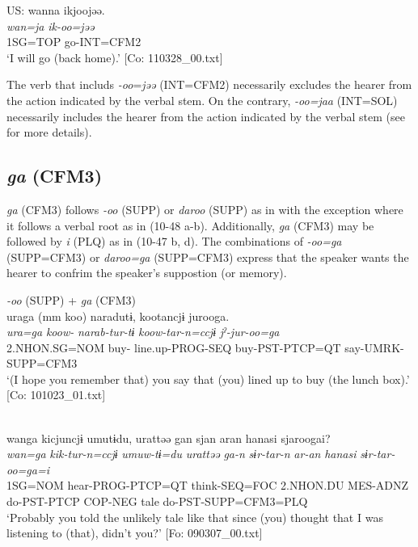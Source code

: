 \begin{xlist}
  \ex  US: 
      \glll wanna  ikjoojəə.\\
      \textit{wan=ja}  \textit{ik-oo=jəə}\\
      1SG=TOP  go-INT=CFM2\\
      \glt       ‘I will go (back home).’ [Co: 110328\_00.txt]
    \z
\z

The verb that includs \textit{{}-oo}=\textit{jəə} (INT=CFM2) necessarily excludes the hearer from the action indicated by the verbal stem. On the contrary, \textit{{}-oo=jaa} (INT=SOL) necessarily includes the hearer from the action indicated by the verbal stem (see  for more details).

\subsection{\textit{ga} (CFM3)}\label{sec:10.3.5}

\textit{ga} (CFM3) follows \textit{{}-oo} (SUPP) or \textit{daroo} (SUPP) as in  with the exception where it follows a verbal root as in (10-48 a-b). Additionally, \textit{ga} (CFM3) may be followed by \textit{i} (PLQ) as in (10-47 b, d). The combinations of \textit{{}-oo=ga} (SUPP=CFM3) or \textit{daroo=ga} (SUPP=CFM3) express that the speaker wants the hearer to confrim the speaker’s suppostion (or memory).

\ea\label{ex:10.47}   
 \begin{xlist}
 \exi{} \textit{{}-oo} (SUPP) + \textit{ga} (CFM3)\\
  \ex  %
      \glll    uraga  (mm  koo)  naradutɨ,  kootancjɨ    jurooga.\\
      \textit{ura=ga}    \textit{koow-}  \textit{narab-tur-tɨ}  \textit{koow-tar-n=ccjɨ}  \textit{jˀ-jur-oo=ga}\\
      2.NHON.SG=NOM    buy-  line.up-PROG-SEQ  buy-PST-PTCP=QT  say-UMRK-SUPP=CFM3\\
      \glt       ‘(I hope you remember that) you say that (you) lined up to buy (the lunch box).’ [Co: 101023\_01.txt]

  \ex\relax  [= (8-41)]\\
      \glll    wanga  kicjuncjɨ  umutɨdu,  urattəə   gan  sjan  aran  hanasi  sjaroogai?\\
      \textit{wan=ga}  \textit{kik-tur-n=ccjɨ}  \textit{umuw-tɨ=du}  \textit{urattəə}   \textit{ga-n}  \textit{sɨr-tar-n}  \textit{ar-an}  \textit{hanasi}  \textit{sɨr-tar-oo=ga=i}\\
      1SG=NOM  hear-PROG-PTCP=QT  think-SEQ=FOC  2.NHON.DU  MES-ADNZ  do-PST-PTCP  COP-NEG  tale  do-PST-SUPP=CFM3=PLQ\\
      \glt       ‘Probably you told the unlikely tale like that since (you) thought that I was listening to (that), didn’t you?’ [Fo: 090307\_00.txt]


\end{xlist}
\end{xlist}
